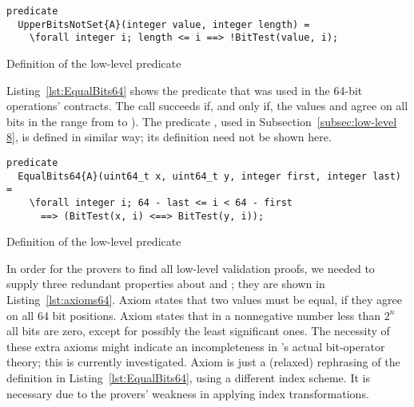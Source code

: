 \begin{listing}[hbt]
\begin{minipage}{0.99\textwidth}
\begin{lstlisting}[style=acsl-block]
predicate
  UpperBitsNotSet{A}(integer value, integer length) =
    \forall integer i; length <= i ==> !BitTest(value, i);
\end{lstlisting}
\end{minipage}
\caption{\label{lst:UpperBitsNotSet integer}
	Definition of the low-level predicate }
\end{listing}

\FloatBarrier


Listing~\ref{lst:EqualBits64} shows the predicate
 that was used in the 64-bit
operations' contracts.
%
The call  succeeds if, and only
if, the  values   and  
agree on all bits in the range from  to ).
%
The predicate , used in
Subsection~\ref{subsec:low-level 8}, is defined in similar way; its
definition need not be shown here.










\begin{listing}[hbt]
\begin{minipage}{0.99\textwidth}
\begin{lstlisting}[style=acsl-block]
predicate
  EqualBits64{A}(uint64_t x, uint64_t y, integer first, integer last) =
    \forall integer i; 64 - last <= i < 64 - first 
      ==> (BitTest(x, i) <==> BitTest(y, i));
\end{lstlisting}
\end{minipage}
\caption{\label{lst:EqualBits64}
        Definition of the low-level predicate }
\end{listing}

\FloatBarrier








In order for the provers to find all low-level validation proofs, we
needed to supply three redundant properties about
 and ; they are shown
in Listing~\ref{lst:axioms64}.
%
Axiom  states that two 
values must be equal, if they agree on all 64 bit positions.
%
Axiom  states that in a nonnegative number
less than $2^n$ all bits are zero, except for possibly
the least significant  ones.
%
The necessity of these extra axioms might indicate an
incompleteness in \framac's actual bit-operator theory; this is currently
investigated.
%
Axiom  is just a (relaxed)
rephrasing of the definition
in Listing~\ref{lst:EqualBits64}, using a different index scheme.
%
It is necessary due to the provers' weakness in applying index
transformations.










